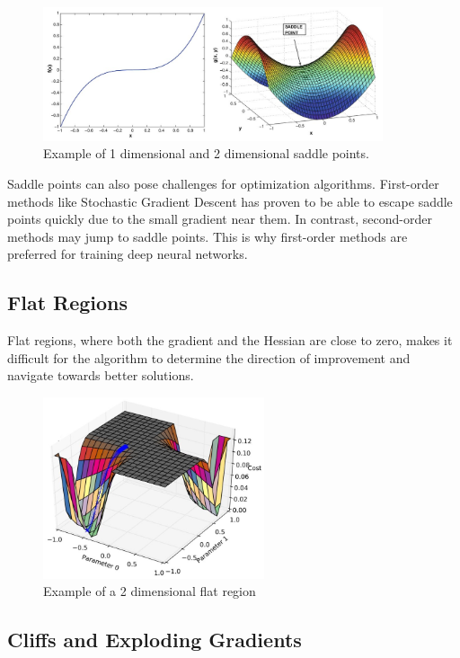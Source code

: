 \begin{figure}[h]
    \centering
    \includegraphics[width=10cm]{Plots/saddle-point.jpg}
    \caption{Example of 1 dimensional and 2 dimensional saddle points.}
\end{figure}

\noindent Saddle points can also pose challenges for optimization algorithms. First-order methods like Stochastic Gradient Descent has proven to be able to escape saddle points quickly due to the small gradient near them. In contrast, second-order methods may jump to saddle points. This is why first-order methods are preferred for training deep neural networks.

\newpage

\subsection{Flat Regions}

Flat regions, where both the gradient and the Hessian are close to zero, makes it difficult for the algorithm to determine the direction of improvement and navigate towards better solutions.

\begin{figure}[h]
    \centering
    \includegraphics[width=6.5cm]{Plots/flat-regions.jpg}
    \caption{Example of a 2 dimensional flat region}
\end{figure}

\subsection{Cliffs and Exploding Gradients}

